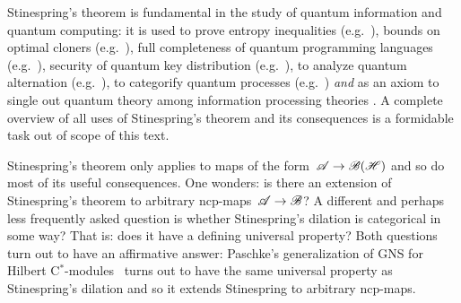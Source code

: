 \begin{parsec}
\begin{point}%
Stinespring's theorem
is fundamental in the study
of quantum information and quantum computing:
it is used to prove entropy inequalities (e.g.~\cite{lindblad}),
bounds on optimal cloners (e.g.~\cite{werner}),
full completeness of quantum programming languages (e.g.~\cite{staton}),
security of quantum key distribution (e.g.~\cite{werner2,kissinger2017picture}),
to analyze quantum alternation (e.g.~\cite{prakash}),
to categorify quantum processes (e.g.~\cite{selinger}) \emph{and}
as an axiom to single out
quantum theory among information processing theories \cite{chiribella}.
A complete overview of all uses of Stinespring's theorem and its consequences
is a formidable task out of scope of this text.

Stinespring's theorem only applies
to maps of the form~$\mathscr{A} \to \mathscr{B}(\mathscr{H})$
    and so do most of its useful consequences.
One wonders:
    is there an extension of Stinespring's theorem
    to arbitrary ncp-maps~$\mathscr{A} \to \mathscr{B}$?
A different and perhaps less frequently asked question is whether
     Stinespring's dilation is categorical in some way?
That is: does it have a defining universal property?
Both questions turn out to have an affirmative answer:
Paschke's generalization of GNS for Hilbert C$^*$-modules~\cite{paschke}
    turns out to have the same universal property
        as Stinespring's dilation and so it extends Stinespring
        to arbitrary ncp-maps.


\end{point}
\end{parsec}
